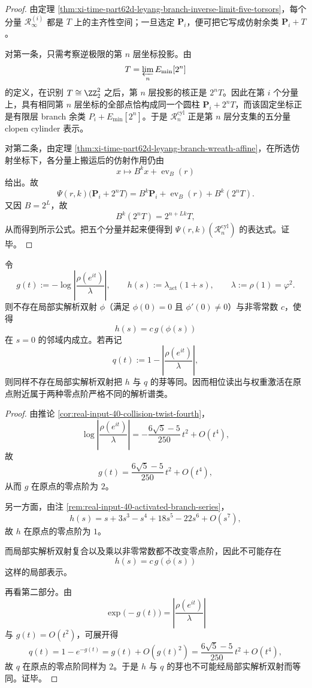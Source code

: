 \begin{proof}
由定理 \ref{thm:xi-time-part62d-leyang-branch-inverse-limit-five-torsors}，每个分量 \(\mathcal R_\infty^{(i)}\) 都是 \(T\) 上的主齐性空间；一旦选定 \(\mathbf P_i\)，便可把它写成仿射余类 \(\mathbf P_i+T\)。

对第一条，只需考察逆极限的第 \(n\) 层坐标投影。由
\[
T=\varprojlim_n E_{\min}[2^n]
\]
的定义，在识别 \(T\cong \ZZ_2^2\) 之后，第 \(n\) 层投影的核正是 \(2^nT\)。因此在第 \(i\) 个分量上，具有相同第 \(n\) 层坐标的全部点恰构成同一个圆柱 \(\mathbf P_i+2^nT\)，而该固定坐标正是有限层 branch 余类 \(P_i+E_{\min}[2^n]\)。于是 \(\mathcal R_n^{\mathrm{cyl}}\) 正是第 \(n\) 层分支集的五分量 clopen cylinder 表示。

对第二条，由定理 \ref{thm:xi-time-part62d-leyang-branch-wreath-affine}，在所选仿射坐标下，各分量上搬运后的仿射作用仍由
\[
x\longmapsto B^k x+\operatorname{ev}_B(r)
\]
给出。故
\[
\Psi(r,k)\bigl(\mathbf P_i+2^nT\bigr)
=
B^k\mathbf P_i+\operatorname{ev}_B(r)+B^k(2^nT).
\]
又因 \(B=2^L\)，故
\[
B^k(2^nT)=2^{n+Lk}T,
\]
从而得到所示公式。把五个分量并起来便得到 \(\Psi(r,k)(\mathcal R_n^{\mathrm{cyl}})\) 的表达式。证毕。
\end{proof}

\begin{theorem}[相位扭曲芽与激活芽的零点阶严格分离]\label{thm:xi-time-part62dg-phase-activation-germ-order-separation}
令
\[
g(t):=-\log\left|\frac{\rho(e^{it})}{\lambda}\right|,
\qquad
h(s):=\lambda_{\mathrm{act}}(1+s),
\qquad
\lambda:=\rho(1)=\varphi^2.
\]
则不存在局部实解析双射 \(\phi\)（满足 \(\phi(0)=0\) 且 \(\phi'(0)\neq 0\)）与非零常数 \(c\)，使得
\[
h(s)=c\,g(\phi(s))
\]
在 \(s=0\) 的邻域内成立。若再记
\[
q(t):=1-\left|\frac{\rho(e^{it})}{\lambda}\right|,
\]
则同样不存在局部实解析双射把 \(h\) 与 \(q\) 的芽等同。因而相位读出与权重激活在原点附近属于两种零点阶严格不同的解析谱类。
\end{theorem}
\begin{proof}
由推论 \ref{cor:real-input-40-collision-twist-fourth}，
\[
\log\left|\frac{\rho(e^{it})}{\lambda}\right|
=
-\frac{6\sqrt5-5}{250}\,t^2+O(t^4),
\]
故
\[
g(t)=\frac{6\sqrt5-5}{250}\,t^2+O(t^4),
\]
从而 \(g\) 在原点的零点阶为 \(2\)。

另一方面，由注 \ref{rem:real-input-40-activated-branch-series}，
\[
h(s)
=
s+3s^3-s^4+18s^5-22s^6+O(s^7),
\]
故 \(h\) 在原点的零点阶为 \(1\)。

而局部实解析双射复合以及乘以非零常数都不改变零点阶，因此不可能存在
\[
h(s)=c\,g(\phi(s))
\]
这样的局部表示。

再看第二部分。由
\[
\exp\bigl(-g(t)\bigr)
=
\left|\frac{\rho(e^{it})}{\lambda}\right|
\]
与 \(g(t)=O(t^2)\)，可展开得
\[
q(t)=1-e^{-g(t)}=g(t)+O(g(t)^2)
=
\frac{6\sqrt5-5}{250}\,t^2+O(t^4),
\]
故 \(q\) 在原点的零点阶同样为 \(2\)。于是 \(h\) 与 \(q\) 的芽也不可能经局部实解析双射而等同。证毕。
\end{proof}

